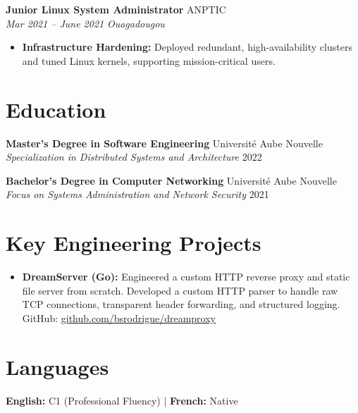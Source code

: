 \documentclass[a4paper,10pt]{article}
\newcommand{\jobheader}[4]{%
    \textbf{#1} \hfill #2 \\
    \textit{#3} \hfill \textit{#4}
    \vspace{0.05cm}
}
\begin{document}
\vspace{0.15cm}

\jobheader{Junior Linux System Administrator}{ANPTIC}{Mar 2021 -- June 2021}{Ouagadougou}
\begin{itemize}[leftmargin=*,nosep]
    \item \textbf{Infrastructure Hardening:} Deployed redundant, high-availability clusters and tuned Linux kernels, supporting mission-critical users.
\end{itemize}

\section*{Education}
\textbf{Master's Degree in Software Engineering} \hfill Université Aube Nouvelle \\
\textit{Specialization in Distributed Systems and Architecture} \hfill 2022

\textbf{Bachelor's Degree in Computer Networking} \hfill Université Aube Nouvelle \\
\textit{Focus on Systems Administration and Network Security} \hfill 2021

\section*{Key Engineering Projects}
\begin{itemize}[leftmargin=*,nosep]
    \item \textbf{DreamServer (Go):} Engineered a custom HTTP reverse proxy and static file server from scratch. Developed a custom HTTP parser to handle raw TCP connections, transparent header forwarding, and structured logging. \\
    GitHub: \href{https://github.com/bsrodrigue/dreamproxy}{github.com/bsrodrigue/dreamproxy}
\end{itemize}

\section*{Languages}
\textbf{English:} C1 (Professional Fluency) | \textbf{French:} Native
\end{document}
